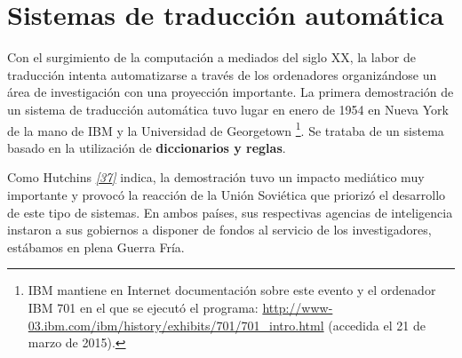 \documentclass[a4paper,12pt,spanish]{book}
\begin{document}
\section{Sistemas de traducción automática}
\label{0.intro:sistemas-de-traduccion-automatica}
Con el surgimiento de la computación a mediados del siglo XX, la labor de traducción
intenta automatizarse a través de los ordenadores organizándose un área de investigación
con una proyección importante. La primera demostración de un sistema de traducción
automática tuvo lugar en enero de 1954 en Nueva York de la mano de IBM y la Universidad
de Georgetown \footnote{
IBM mantiene en Internet documentación sobre este evento y el ordenador
IBM 701 en el que se ejecutó el programa: \href{http://www-03.ibm.com/ibm/history/exhibits/701/701\_intro.html}{http://www-03.ibm.com/ibm/history/exhibits/701/701\_intro.html} (accedida el 21 de marzo de 2015).
}. Se trataba de un sistema basado en la utilización de \textbf{diccionarios
y reglas}.

Como Hutchins \label{0.intro:id14}{\hyperref[zreferences:hutchins1994]{\emph{{[}37{]}}}} indica, la demostración tuvo un impacto
mediático muy importante y provocó la reacción de la Unión Soviética que priorizó el
desarrollo de este tipo de sistemas. En ambos países, sus respectivas agencias de
inteligencia instaron a sus gobiernos a disponer de fondos al servicio de los
investigadores, estábamos en plena Guerra Fría.
\end{document}
